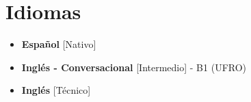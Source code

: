 \documentclass[11pt,a4paper,sans]{moderncv}
\newcommand{\sectionMargin}{-3mm}
\begin{document}
\vspace*{\sectionMargin}

\section{Idiomas}{
    \begin{multicols}{2}
        \begin{itemize}[label=\textbullet]
        \item \textbf{Español} [Nativo]
        \item \textbf{Inglés - Conversacional} [Intermedio] - B1 (UFRO)
        \item \textbf{Inglés} [Técnico]
        \end{itemize}
    \end{multicols}
}
\end{document}
